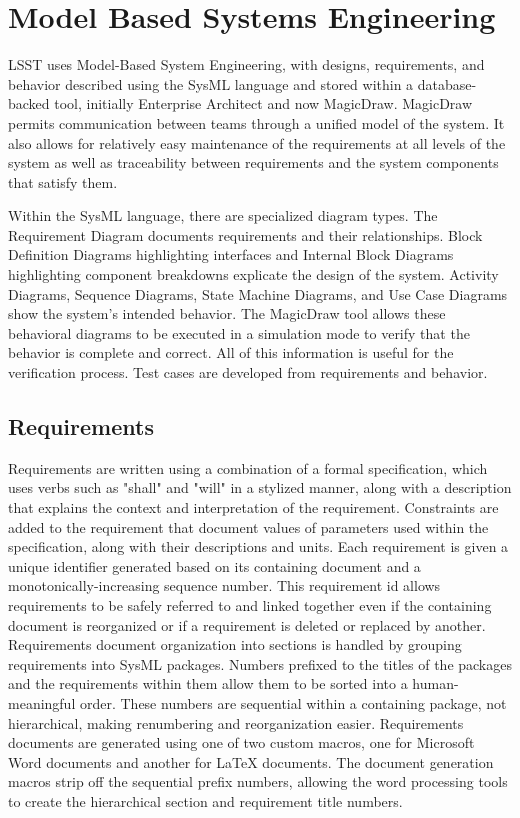 \section{Model Based Systems Engineering}

LSST uses Model-Based System Engineering, with designs, requirements, and behavior described using the SysML language and stored within a database-backed tool, initially Enterprise Architect and now MagicDraw.
MagicDraw permits communication between teams through a unified model of the system.
It also allows for relatively easy maintenance of the requirements at all levels of the system as well as traceability between requirements and the system components that satisfy them.

Within the SysML language, there are specialized diagram types.
The Requirement Diagram documents requirements and their relationships.
Block Definition Diagrams highlighting interfaces and Internal Block Diagrams highlighting component breakdowns explicate the design of the system.
Activity Diagrams, Sequence Diagrams, State Machine Diagrams, and Use Case Diagrams show the system's intended behavior.
The MagicDraw tool allows these behavioral diagrams to be executed in a simulation mode to verify that the behavior is complete and correct.
All of this information is useful for the verification process.
Test cases are developed from requirements and behavior.

\subsection{Requirements}

Requirements are written using a combination of a formal specification, which uses verbs such as "shall" and "will" in a stylized manner, along with a description that explains the context and interpretation of the requirement.
Constraints are added to the requirement that document values of parameters used within the specification, along with their descriptions and units.
Each requirement is given a unique identifier generated based on its containing document and a monotonically-increasing sequence number.
This requirement id allows requirements to be safely referred to and linked together even if the containing document is reorganized or if a requirement is deleted or replaced by another.
Requirements document organization into sections is handled by grouping requirements into SysML packages.
Numbers prefixed to the titles of the packages and the requirements within them allow them to be sorted into a human-meaningful order.
These numbers are sequential within a containing package, not hierarchical, making renumbering and reorganization easier.
Requirements documents are generated using one of two custom macros, one for Microsoft Word documents and another for LaTeX documents.
The document generation macros strip off the sequential prefix numbers, allowing the word processing tools to create the hierarchical section and requirement title numbers.

